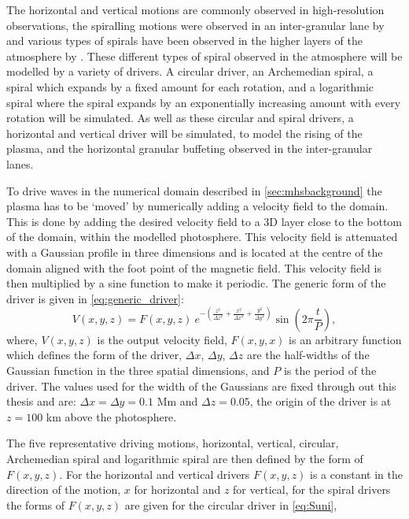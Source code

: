 The horizontal and vertical motions are commonly observed in high-resolution observations, the spiralling motions were observed in an inter-granular lane by \cite{bonet2008, bonet2010} and various types of spirals have been observed in the higher layers of the atmosphere by \cite{wedemeyer-bohm2009,wedemeyer-bohm2012,wedemeyer2013}.
These different types of spiral observed in the atmosphere will be modelled by a variety of drivers.
A circular driver, an Archemedian spiral, a spiral which expands by a fixed amount for each rotation, and a logarithmic spiral where the spiral expands by an exponentially increasing amount with every rotation will be simulated.
As well as these circular and spiral drivers, a horizontal and vertical driver will be simulated, to model the rising of the plasma, and the horizontal granular buffeting observed in the inter-granular lanes.

To drive waves in the numerical domain described in \cref{sec:mhsbackground} the plasma has to be `moved' by numerically adding a velocity field to the domain.
This is done by adding the desired velocity field to a 3D layer close to the bottom of the domain, within the modelled photosphere.
This velocity field is attenuated with a Gaussian profile in three dimensions and is located at the centre of the domain aligned with the foot point of the magnetic field.
This velocity field is then multiplied by a sine function to make it periodic. The generic form of the driver is given in \cref{eq:generic_driver}:
\begin{equation}
	V(x,y,z) = F(x,y,z) \ e^{-\left(\frac{z^2}{\Delta z^2} + \frac{x^2}{\Delta x^2} + \frac{y^2}{\Delta y^2}\right)} \sin \left(2\pi \frac{t}{P}\right),
	\label{eq:generic_driver}
\end{equation}
where, $V(x,y,z)$ is the output velocity field, $F(x,y,x)$ is an arbitrary function which defines the form of the driver, $\Delta x$, $\Delta y$, $\Delta z$ are the half-widths of the Gaussian function in the three spatial dimensions, and $P$ is the period of the driver.
The values used for the width of the Gaussians are fixed through out this thesis and are: $\Delta x = \Delta y = 0.1$ Mm and $\Delta z = 0.05$, the origin of the driver is at $z = 100$ km above the photosphere.

The five representative driving motions, horizontal, vertical, circular, Archemedian spiral and logarithmic spiral \cite{feynman1964} are then defined by the form of $F(x,y,z)$. For the horizontal and vertical drivers $F(x,y,z)$ is a constant in the direction of the motion, $x$ for horizontal and $z$ for vertical, for the spiral drivers the forms of $F(x,y,z)$ are given for the circular driver in \cref{eq:Suni},

